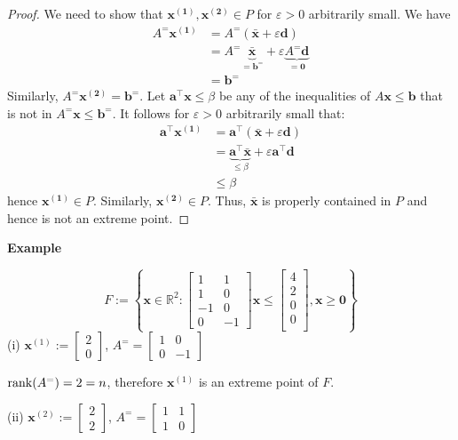 \begin{proof}
We need to show that $ \bm{x^{(1)}},\bm{x^{(2)}}\in P $
for  $ \varepsilon > 0 $ arbitrarily small. We have
\begin{align*}
    A^= \bm{x^{(1)}}&=A^=(\bm{\bar{x}} + \varepsilon \bm{d})\\
    &=A^= \underbrace{\bm{\bar{x}}}_{=\bm{b^=}}
    +\varepsilon\underbrace{A^= \bm{d}}_{=\bm{0}}\\
    &=\bm{b^=}
\end{align*}
Similarly, $ A^= \bm{x^{(2)}}= \bm{b^=}$. Let $ \bm{a}^\top \bm{x}\le \beta $
be any of the inequalities of $ A \bm{x}\le \bm{b} $ that is not in
$ A^= \bm{x}\le \bm{b}^= $. 
It follows for $ \varepsilon >0 $ arbitrarily small that:
\begin{align*}
    \bm{a}^\top \bm{x^{(1)}}&= \bm{a}^\top(\bm{\bar{x}} + \varepsilon \bm{d})\\
    &=\underbrace{\bm{a}^\top \bm{\bar{x}}}_{\le \beta}+
    \varepsilon \bm{a}^\top \bm{d}\\
    &\le \beta
\end{align*}
hence $ \bm{x^{(1)}}\in P $. Similarly, $ \bm{x^{(2)}}\in P $. Thus, 
$ \bm{\bar{x}} $ is properly contained in $ P $ and hence is not
an extreme point.
\end{proof}

\textbf{Example}

\[ F:=\left\{ \bm{x}\in\mathbb{R}^2: \begin{bmatrix}
    1 & 1\\
    1 & 0\\
    -1 & 0\\
    0 & -1
\end{bmatrix}\bm{x}\le
\begin{bmatrix}
    4\\
    2\\
    0\\
    0\\
\end{bmatrix}, \bm{x}\ge \bm{0} \right\} \]
(i) 
$\bm{x}^{(1)}:=\begin{bmatrix}2\\0\end{bmatrix}$,
$ A^= =
\begin{bmatrix}
    1 & 0\\
    0 & -1
\end{bmatrix} $

$ \operatorname{rank}(A^=)=2=n $, therefore $\bm{x}^{(1)}$ is an extreme
point of $ F $.

(ii)
$\bm{x}^{(2)}:=\begin{bmatrix}2\\2\end{bmatrix}$,
$ A^= =
\begin{bmatrix}
    1 & 1\\
    1 & 0
\end{bmatrix} $

